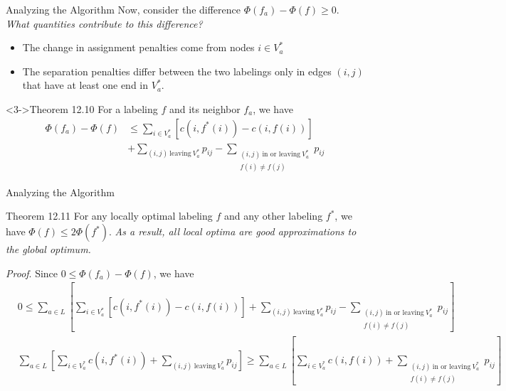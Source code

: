 \documentclass[10pt]{beamer}
\begin{document}
\begin{frame}{Analyzing the Algorithm}
	Now, consider the difference $\Phi(f_a) - \Phi(f) \geq 0$. \textit{What quantities contribute to this difference?}
	\begin{itemize}
		\item The change in assignment penalties come from nodes $i \in V_a^*$
		\item The separation penalties differ between the two labelings only in edges $(i, j)$ that have at least one end in $V_a^*$.
	\end{itemize}
	\begin{block}<3->{Theorem 12.10}
		For a labeling $f$ and its neighbor $f_a$, we have
		\begin{align*}
		\Phi(f_a) - \Phi(f) &\leq \sum_{i \in V_a^*} \left[c(i, f^*(i)) - c(i, f(i))\right] \\&+ \sum_{(i, j)\: \text{leaving}\: V_a^*} p_{ij} - \sum_{\substack{(i, j)\: \text{in or leaving}\: V_a^* \\ f(i)\neq f(j)}} p_{ij}
		\end{align*}
	\end{block}
\end{frame}

\begin{frame}{Analyzing the Algorithm}
	\begin{block}{Theorem 12.11}
		For any locally optimal labeling $f$ and any other labeling $f^*$, we have $\Phi(f) \leq 2\Phi(f^*)$. \textit{As a result, all local optima are good approximations to the global optimum.}
	\end{block}
	\textit{Proof}. Since $0 \leq \Phi(f_a) - \Phi(f)$, we have
	\small
	\begin{align*}
	&0 \leq \sum_{a \in L} \left\lbrack \sum_{i \in V_a^*} \left[c(i, f^*(i)) - c(i, f(i))\right] + \sum_{(i, j)\: \text{leaving}\: V_a^*} p_{ij} - \sum_{\substack{(i, j)\: \text{in or leaving}\: V_a^* \\ f(i)\neq f(j)}} p_{ij} \right\rbrack\\
	&\sum_{a \in L} \left\lbrack \sum_{i \in V_a^*} c(i, f^*(i)) + \sum_{(i, j)\: \text{leaving}\: V_a^*} p_{ij} \right\rbrack \geq \sum_{a \in L} \left\lbrack \sum_{i \in V_a^*} c(i, f(i)) + \sum_{\substack{(i, j)\: \text{in or leaving}\: V_a^* \\ f(i)\neq f(j)}} p_{ij} \right\rbrack
	\end{align*}
	\normalsize
\end{frame}
\end{document}
